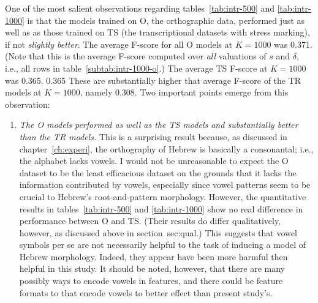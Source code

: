 One of the most salient observations regarding tables~\ref{tab:intr-500} and \ref{tab:intr-1000}
 is that the models trained on O, the orthographic data, performed just as well as as those trained on TS
  (the transcriptional datasets with stress marking), if not \emph{slightly better}. The average F-score for all O models 
 at $K=1000$ was 0.371. (Note that this is the average F-score computed over \emph{all} valuations of $s$
   and $\delta$, i.e., all rows in table~\ref{subtab:intr-1000-o}.) %
   The average TS F-score at $K=1000$ was 0.365. 
   0.365 %
   These are substantially higher that average F-score of the TR models at $K=1000$, namely 0.308.
  Two important points emerge from this observation: 
  \begin{enumerate}
 \item \emph{The O models performed as well as the TS models and substantially better than the
  TR models.} 
 This is a surprising result because, as discussed in chapter~\ref{ch:experi}, 
 the orthography of Hebrew is basically a consonantal; i.e., the alphabet lacks vowels. 
I would not be unreasonable to expect the O dataset to be the least efficacious dataset on the grounds 
that it lacks the information contributed by vowels, especially since vowel patterns seem to be crucial to Hebrew's 
root-and-pattern morphology. However, the quantitative results in tables~\ref{tab:intr-500} and \ref{tab:intr-1000} 
show no real difference in performance between O and TS. 
(Their results do differ qualitatively, however, as discussed above in section~{sec:qual}.) 
This suggests that vowel symbols per se are not necessarily 
helpful to the task of inducing a model of Hebrew morphology. Indeed, they appear have been more harmful then helpful in this study. It should be noted, however, that there are many possibly ways to encode vowels in features, and there could be feature formats to that encode vowels to better effect than present study's.

\end{enumerate}
